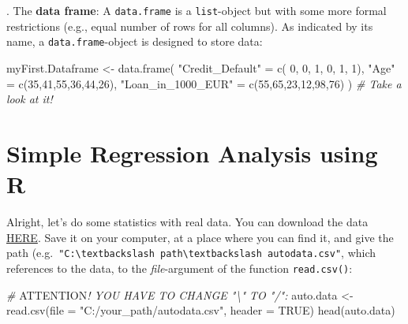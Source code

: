 \documentclass[
  14pt,
]{memoir}
\newenvironment{Shaded}{\begin{snugshade}}{\end{snugshade}}
\newcommand{\AlertTok}[1]{\textcolor[rgb]{0.94,0.16,0.16}{#1}}
\newcommand{\AttributeTok}[1]{\textcolor[rgb]{0.77,0.63,0.00}{#1}}
\newcommand{\CommentTok}[1]{\textcolor[rgb]{0.56,0.35,0.01}{\textit{#1}}}
\newcommand{\ConstantTok}[1]{\textcolor[rgb]{0.00,0.00,0.00}{#1}}
\newcommand{\DecValTok}[1]{\textcolor[rgb]{0.00,0.00,0.81}{#1}}
\newcommand{\FunctionTok}[1]{\textcolor[rgb]{0.00,0.00,0.00}{#1}}
\newcommand{\NormalTok}[1]{#1}
\newcommand{\OtherTok}[1]{\textcolor[rgb]{0.56,0.35,0.01}{#1}}
\newcommand{\StringTok}[1]{\textcolor[rgb]{0.31,0.60,0.02}{#1}}
\begin{document}
\hfill\break
\hfill{}. The \textbf{data frame}: A \texttt{data.frame} is a \texttt{list}-object but with some more formal restrictions (e.g., equal number of rows for all columns). As indicated by its name, a \texttt{data.frame}-object is designed to store data:

\begin{Shaded}
\begin{Highlighting}[]
\NormalTok{myFirst.Dataframe }\OtherTok{\textless{}{-}} \FunctionTok{data.frame}\NormalTok{(}
  \StringTok{"Credit\_Default"}   \OtherTok{=} \FunctionTok{c}\NormalTok{( }\DecValTok{0}\NormalTok{, }\DecValTok{0}\NormalTok{, }\DecValTok{1}\NormalTok{, }\DecValTok{0}\NormalTok{, }\DecValTok{1}\NormalTok{, }\DecValTok{1}\NormalTok{), }
  \StringTok{"Age"}              \OtherTok{=} \FunctionTok{c}\NormalTok{(}\DecValTok{35}\NormalTok{,}\DecValTok{41}\NormalTok{,}\DecValTok{55}\NormalTok{,}\DecValTok{36}\NormalTok{,}\DecValTok{44}\NormalTok{,}\DecValTok{26}\NormalTok{), }
  \StringTok{"Loan\_in\_1000\_EUR"} \OtherTok{=} \FunctionTok{c}\NormalTok{(}\DecValTok{55}\NormalTok{,}\DecValTok{65}\NormalTok{,}\DecValTok{23}\NormalTok{,}\DecValTok{12}\NormalTok{,}\DecValTok{98}\NormalTok{,}\DecValTok{76}\NormalTok{)}
\NormalTok{) }
\CommentTok{\# Take a look at it!}
\end{Highlighting}
\end{Shaded}

\hfill\break

\hypertarget{simple-regression-analysis-using-r}{%
\section{Simple Regression Analysis using R}\label{simple-regression-analysis-using-r}}

Alright, let's do some statistics with real data. You can download the data \href{https://github.com/lidom/Teaching_Repo}{HERE}. Save it on your computer, at a place where you can find it, and give the path (e.g.~\texttt{"C:\textbackslash{}textbackslash\ path\textbackslash{}textbackslash\ autodata.csv"}, which references to the data, to the \emph{file}-argument of the function \texttt{read.csv()}:

\begin{Shaded}
\begin{Highlighting}[]
\CommentTok{\# }\AlertTok{ATTENTION}\CommentTok{! YOU HAVE TO CHANGE "\textbackslash{}" TO "/":}
\NormalTok{auto.data }\OtherTok{\textless{}{-}} \FunctionTok{read.csv}\NormalTok{(}\AttributeTok{file   =} \StringTok{"C:/your\_path/autodata.csv"}\NormalTok{, }
                      \AttributeTok{header =} \ConstantTok{TRUE}\NormalTok{)}
\FunctionTok{head}\NormalTok{(auto.data)}
\end{Highlighting}
\end{Shaded}
\end{document}
